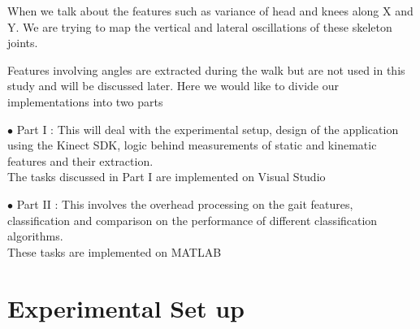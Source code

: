 \noindent When we talk about the features such as variance of head and knees along X and Y. We are trying to map the vertical and lateral oscillations of these skeleton joints.

\noindent Features involving angles are extracted during the walk but are not used in this study and will be discussed later. Here we would like to divide our implementations into two parts

\noindent$\bullet$ Part I  : This will deal with the experimental setup, design of the application using the Kinect SDK, logic behind measurements of static and kinematic features and their extraction.\\
The tasks discussed in Part I are implemented on Visual Studio

\noindent$\bullet$ Part II  : This involves the overhead processing on the gait features, classification and comparison on the performance of different classification algorithms.\\
These tasks are implemented on MATLAB


\section{Experimental Set up } \label{Experimental Set up }

